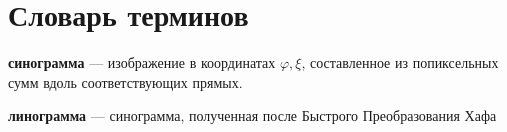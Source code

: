 \chapter*{Словарь терминов}             %

\textbf{синограмма} --- изображение в координатах $\varphi, \xi$, составленное из попиксельных сумм вдоль соответствующих прямых.

\textbf{линограмма} --- синограмма, полученная после Быстрого Преобразования Хафа


